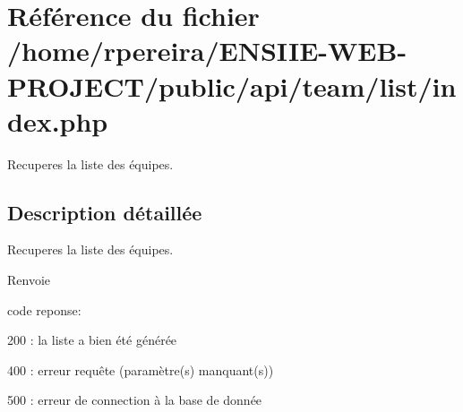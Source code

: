 \hypertarget{team_2list_2index_8php}{}\section{Référence du fichier /home/rpereira/\+E\+N\+S\+I\+I\+E-\/\+W\+E\+B-\/\+P\+R\+O\+J\+E\+C\+T/public/api/team/list/index.php}
\label{team_2list_2index_8php}


Recuperes la liste des équipes.  




\subsection{Description détaillée}
Recuperes la liste des équipes. 

\begin{DoxyReturn}{Renvoie}

\begin{DoxyItemize}
\item code reponse\+:
\begin{DoxyItemize}
\item 200 \+: la liste a bien été générée
\item 400 \+: erreur requête (paramètre(s) manquant(s))
\item 500 \+: erreur de connection à la base de donnée 
\end{DoxyItemize}
\end{DoxyItemize}
\end{DoxyReturn}
